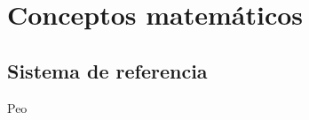 \documentclass[../main.tex]{subfiles}
\begin{document}
\chapter{Conceptos matemáticos}
\section{Sistema de referencia}
Peo
 
\end{document}
